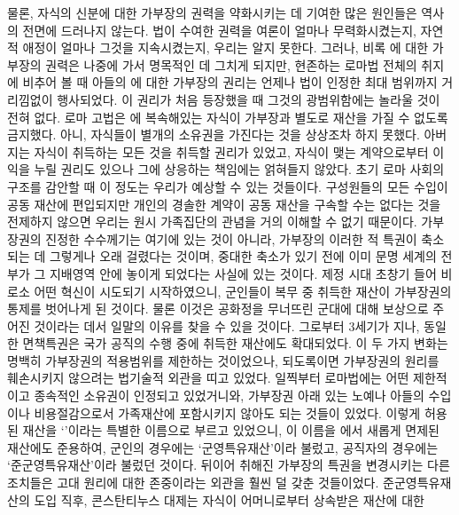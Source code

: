 물론,
자식의 신분에 대한 가부장의 권력을 약화시키는 데 기여한 많은 원인들은
역사의 전면에 드러나지 않는다.
법이 수여한 권력을 여론이 얼마나 무력화시켰는지,
자연적 애정이 얼마나 그것을 지속시켰는지,
우리는 알지 못한다.
그러나, 비록 에 대한 가부장의 권력은 나중에 가서
명목적인 데 그치게 되지만,
현존하는 로마법 전체의 취지에 비추어 볼 때
아들의 에 대한 가부장의 권리는 언제나
법이 인정한 최대 범위까지 거리낌없이 행사되었다.
이 권리가 처음 등장했을 때 그것의 광범위함에는 놀라울 것이 전혀 없다.
로마 고법은 에 복속해있는 자식이 가부장과 별도로 재산을
가질 수 없도록 금지했다. 아니, 
자식들이 별개의 소유권을 가진다는 것을 상상조차 하지 못했다.
아버지는 자식이 취득하는 모든 것을 취득할 권리가 있었고,
자식이 맺는 계약으로부터 이익을 누릴 권리도 있으나
그에 상응하는 책임에는 얽혀들지 않았다.
초기 로마 사회의 구조를 감안할 때
이 정도는 우리가 예상할 수 있는 것들이다.
구성원들의 모든 수입이 공동 재산에 편입되지만
개인의 경솔한 계약이 공동 재산을 구속할 수는 없다는 것을
전제하지 않으면 우리는 원시 가족집단의 관념을 거의 이해할 수 없기 때문이다.
가부장권의 진정한 수수께기는 여기에 있는 것이 아니라,
가부장의 이러한 적 특권이 축소되는 데 그렇게나 오래 걸렸다는 것이며,
중대한 축소가 있기 전에 이미 문명 세계의 전부가 그 지배영역 안에
놓이게 되었다는 사실에 있는 것이다.
제정 시대 초창기 들어 비로소 어떤 혁신이 시도되기 시작하였으니,
군인들이 복무 중 취득한 재산이 가부장권의 통제를 벗어나게 된 것이다.
물론 이것은 공화정을 무너뜨린 군대에 대해 보상으로 주어진 것이라는 데서
일말의 이유를 찾을 수 있을 것이다.
그로부터 3세기가 지나, 동일한 면책특권은 국가 공직의 수행 중에 취득한 재산에도
확대되었다.
이 두 가지 변화는 명백히 가부장권의 적용범위를 제한하는 것이었으나,
되도록이면 가부장권의 원리를 훼손시키지 않으려는 법기술적 외관을 띠고 있었다.
일찍부터 로마법에는 어떤 제한적이고 종속적인 소유권이 인정되고 있었거니와,
가부장권 아래 있는 노예나 아들의 수입이나 비용절감으로서
가족재산에 포함시키지 않아도 되는 것들이 있었다. 이렇게 허용된 재산을
`'이라는 특별한 이름으로 부르고 있었으니,
이 이름을 에서 새롭게 면제된 재산에도 준용하여,
군인의 경우에는 `군영특유재산'이라
불렀고, 공직자의 경우에는
`준군영특유재산'이라
불렀던 것이다.
뒤이어 취해진 가부장의 특권을 변경시키는 다른 조치들은
고대 원리에 대한 존중이라는 외관을 훨씬 덜 갖춘 것들이었다.
준군영특유재산의 도입 직후,
콘스탄티누스 대제는 자식이 어머니로부터 상속받은 재산에 대한
